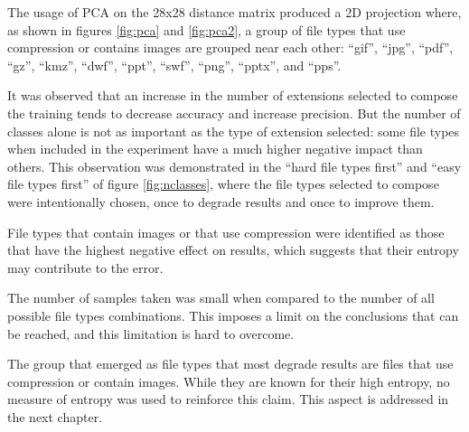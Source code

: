
The usage of PCA on the 28x28 distance matrix produced a 2D projection where, as shown in figures \ref{fig:pca} and \ref{fig:pca2}, a group of file types that use compression or contains images are grouped near each other: 
``gif'',
``jpg'',
``pdf'',
``gz'',
``kmz'',
``dwf'',
``ppt'',
``swf'',
``png'',
``pptx'',
and ``pps''.

It was observed that an increase in the number of extensions selected to compose the training tends to decrease accuracy and increase precision. But the number of classes alone is not as important as the type of extension selected: some file types when included in the experiment have a much higher negative impact than others. This observation was demonstrated in the ``hard file types first'' and ``easy file types first'' of figure \ref{fig:nclasses}, where the file types selected to compose were intentionally chosen, once to degrade results and once to improve them.

File types that contain images or that use compression were identified as those that have the highest negative effect on results, which suggests that their entropy may contribute to the error.

The number of samples taken was small when compared to the number of all possible file types combinations. This imposes a limit on the conclusions that can be reached, and this limitation is hard to overcome.

The group that emerged as file types that most degrade results are files that use compression or contain images. While they are known for their high entropy, no measure of entropy was used to reinforce this claim.
This aspect is addressed in the next chapter.
